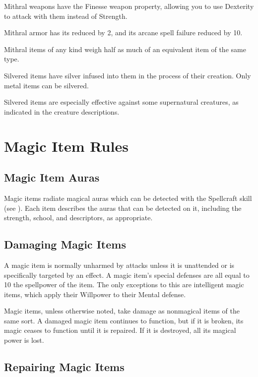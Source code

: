         Mithral weapons have the Finesse weapon property, allowing you to use Dexterity to attack with them instead of Strength.

        Mithral armor has its  reduced by 2, and its arcane spell failure reduced by 10.

        Mithral items of any kind weigh half as much of an equivalent item of the same type.


        Silvered items have silver infused into them in the process of their creation.
        Only metal items can be silvered.

        Silvered items are especially effective against some supernatural creatures, as indicated in the creature descriptions.

\section{Magic Item Rules}

    \subsection{Magic Item Auras}

        Magic items radiate magical auras which can be detected with the Spellcraft skill (see ).
        Each item describes the auras that can be detected on it, including the strength, school, and descriptors, as appropriate.

    \subsection{Damaging Magic Items}

        A magic item is normally unharmed by attacks unless it is unattended or is specifically targeted by an effect.
        A magic item's special defenses are all equal to 10 \add the spellpower of the item.
        The only exceptions to this are intelligent magic items, which apply their Willpower to their Mental defense.

        Magic items, unless otherwise noted, take damage as nonmagical items of the same sort.
        A damaged magic item continues to function, but if it is broken, its magic ceases to function until it is repaired.
        If it is destroyed, all its magical power is lost.

    \subsection{Repairing Magic Items}

